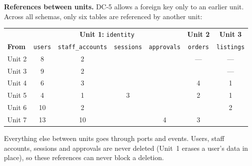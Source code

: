 \documentclass[11pt,a4paper]{article}
\newenvironment{dtable}[1]{\small\begin{longtable}{#1}}{\end{longtable}}
\begin{document}
\textbf{References between units.} DC-5 allows a foreign key only to an earlier unit. Across all schemas, only six tables are referenced by another unit:
\begin{dtable}{@{}>{\raggedright\arraybackslash}p{2.0cm}cccccc@{}}
\toprule
& \multicolumn{4}{c}{\textbf{Unit 1:} \texttt{identity}} & \textbf{Unit 2} & \textbf{Unit 3} \\
\textbf{From} & \texttt{users} & \texttt{staff\_\allowbreak accounts} & \texttt{sessions} & \texttt{approvals} & \texttt{orders} & \texttt{listings} \\ \midrule \endhead
Unit 2 & 8 & 2 & & & --- & --- \\
Unit 3 & 9 & 2 & & & & --- \\
Unit 4 & 6 & 3 & & & 4 & 1 \\
Unit 5 & 4 & 1 & 3 & & 2 & 1 \\
Unit 6 & 10 & 2 & & & & 2 \\
Unit 7 & 13 & 10 & & 4 & 3 & \\
\bottomrule
\end{dtable}
Everything else between units goes through ports and events. Users, staff accounts, sessions and approvals are never deleted (Unit~1 erases a user's data in place), so these references can never block a deletion.
\end{document}
